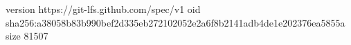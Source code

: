version https://git-lfs.github.com/spec/v1
oid sha256:a38058b83b990bef2d335eb272102052e2a6f8b2141adb4de1e202376ea5855a
size 81507
